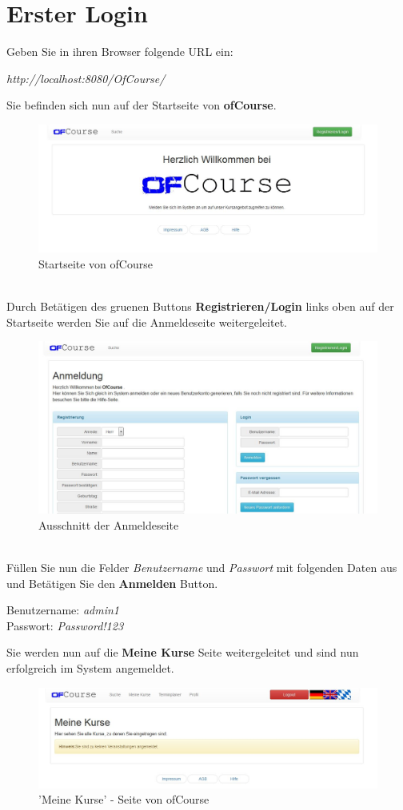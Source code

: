 \documentclass[a4paper, 12pt]{scrreprt}
\begin{document}
\chapter{Erster Login}
Geben Sie in ihren Browser folgende URL ein:
\begin{center}
	{\it http://localhost:8080/OfCourse/}
\end{center}
Sie befinden sich nun auf der Startseite von \textbf{ofCourse}.
\begin{figure}[h]
\centering
\includegraphics[width=0.8\linewidth]{Grafiken/indexPage}
\caption[]{Startseite von ofCourse}
\label{fig:indexPage}
\end{figure} \ \\
Durch Betätigen des  gruenen Buttons \textbf{Registrieren/Login} links oben auf der Startseite werden Sie auf die Anmeldeseite weitergeleitet.
\begin{figure}[h]
\centering
\includegraphics[width=0.8\linewidth]{Grafiken/loginPage}
\caption{Ausschnitt der Anmeldeseite}
\label{fig:loginPage}
\end{figure} \newpage
\ \\
Füllen Sie nun die Felder {\it Benutzername} und {\it Passwort} mit folgenden Daten aus und Betätigen Sie den \textbf{Anmelden} Button.
\begin{center}
	Benutzername: {\it admin1}\\
	Passwort: {\it Password!123}
\end{center}
Sie werden nun auf die \textbf{Meine Kurse} Seite weitergeleitet und sind nun erfolgreich im System angemeldet.
\begin{figure}[h]
\centering
\includegraphics[width=0.8\linewidth]{Grafiken/myCoursesPage}
\caption{'Meine Kurse' - Seite von ofCourse}
\label{fig:myCoursesPage}
\end{figure}
\end{document}
